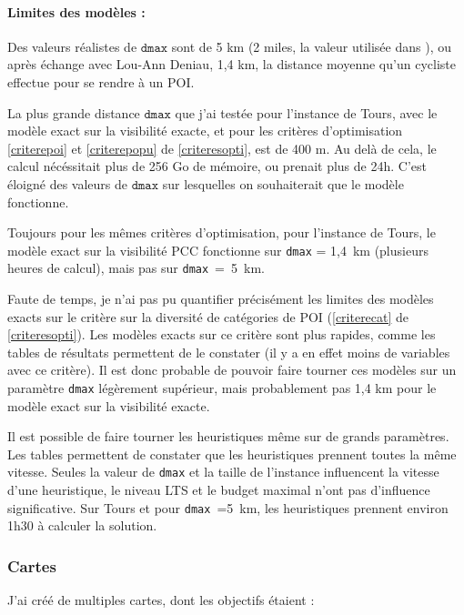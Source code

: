 \paragraph{Limites des modèles :}

Des valeurs réalistes de $\texttt{dmax}$ sont de 5 km (2 miles, la valeur utilisée dans \cite{kent_karner}), ou après échange avec Lou-Ann Deniau, 1,4 km, la distance moyenne qu'un cycliste effectue pour se rendre à un POI.

La plus grande distance $\texttt{dmax}$ que j'ai testée pour l'instance de Tours, avec le modèle exact sur la visibilité exacte, et pour les critères d'optimisation \ref{criterepoi} et \ref{criterepopu} de \ref{criteresopti}, est de 400 m. Au delà de cela, le calcul nécéssitait plus de 256 Go de mémoire, ou prenait plus de 24h. C'est éloigné des valeurs de $\texttt{dmax}$ sur lesquelles on souhaiterait que le modèle fonctionne.

Toujours pour les mêmes critères d'optimisation, pour l'instance de Tours, le modèle exact sur la visibilité PCC fonctionne sur \verb|dmax| = 1,4~km (plusieurs heures de calcul), mais pas sur \verb|dmax|~=~5~km.

Faute de temps, je n'ai pas pu quantifier précisément les limites des modèles exacts sur le critère sur la diversité de catégories de POI (\ref{criterecat} de \ref{criteresopti}). Les modèles exacts sur ce critère sont plus rapides, comme les tables de résultats permettent de le constater (il y a en effet moins de variables avec ce critère). Il est donc probable de pouvoir faire tourner ces modèles sur un paramètre \verb|dmax| légèrement supérieur, mais probablement pas 1,4 km pour le modèle exact sur la visibilité exacte.

Il est possible de faire tourner les heuristiques même sur de grands paramètres. Les tables permettent de constater que les heuristiques prennent toutes la même vitesse. Seules la valeur de \verb|dmax| et la taille de l'instance influencent la vitesse d'une heuristique, le niveau LTS et le budget maximal n'ont pas d'influence significative. Sur Tours et pour \verb|dmax|~=5~km, les heuristiques prennent environ 1h30 à calculer la solution.

\subsubsection{Cartes}

J'ai créé de multiples cartes, dont les objectifs étaient :

